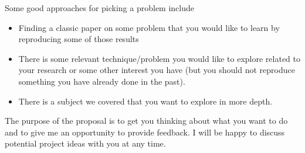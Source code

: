 \documentclass[12pt]{article}
\begin{document}
Some good approaches for picking a problem include
\begin{itemize}
  \item Finding  a classic paper on some problem that you would like to learn by reproducing some of those results
  \item There is some relevant technique/problem you would like to explore related to your research or some other interest you have (but you should not reproduce something you have already done in the past).
  \item There is a subject we covered that you want to explore in more depth.
\end{itemize}

The purpose of the proposal is to get you thinking about what you want to do and to give me an opportunity to provide feedback. I will be happy to discuss potential project ideas with you at any time.
\end{document}
